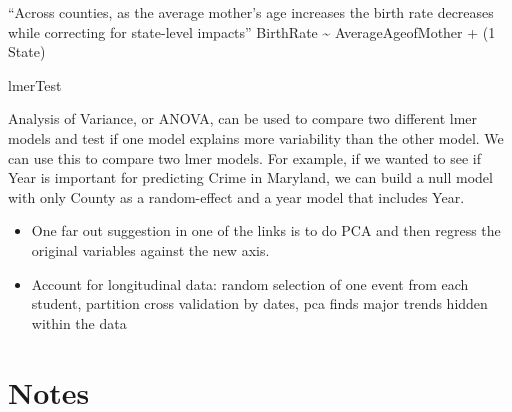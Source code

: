 \documentclass[]{book}
\theoremstyle{definition}
\theoremstyle{definition}
\theoremstyle{definition}
\theoremstyle{remark}
\begin{document}
``Across counties, as the average mother's age increases the birth rate
decreases while correcting for state-level impacts'' BirthRate
\textasciitilde{} AverageAgeofMother + (1 \textbar{} State)

lmerTest

Analysis of Variance, or ANOVA, can be used to compare two different
lmer models and test if one model explains more variability than the
other model. We can use this to compare two lmer models. For example, if
we wanted to see if Year is important for predicting Crime in Maryland,
we can build a null model with only County as a random-effect and a year
model that includes Year.

\begin{itemize}
\item
  One far out suggestion in one of the links is to do PCA and then
  regress the original variables against the new axis.
\item
  Account for longitudinal data: random selection of one event from each
  student, partition cross validation by dates, pca finds major trends
  hidden within the data
\end{itemize}

\chapter{Notes}\label{notes-1}
\end{document}
